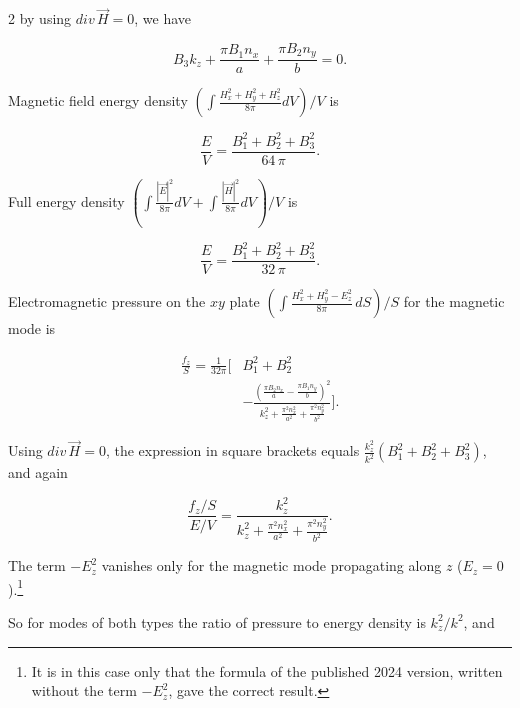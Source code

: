\documentclass[twoside, 10pt]{article}
\begin{document}
\begin{multicols}{2}
    by using \(div\,\vec{H} = 0\), we have

\begin{equation}B_{3} k_{z} + \frac{\pi B_{1} n_{x}}{a} + \frac{\pi B_{2} n_{y}}{b} = 0.\end{equation}

    Magnetic field energy density
\(\left(\int \frac{H_x^2+H_y^2+H_z^2}{8 \pi}dV\right)\big/{V}\) is

\begin{equation}\frac{E}{V} = \frac{{B_{1}^{2} + B_{2}^{2} + B_{3}^{2}}}{64 \, \pi}.\end{equation}

    Full energy density
\(\left(\int \frac{|\vec{E}|^2}{8 \pi}dV + \int \frac{|\vec{H}|^2}{8 \pi}dV\right)\big/{V}\)
is

\begin{equation}\frac{E}{V} = \frac{{B_{1}^{2} + B_{2}^{2} + B_{3}^{2}}}{32 \, \pi}.\end{equation}

    Electromagnetic pressure on the \(xy\) plate
\(\left(\int \frac{H_x^2+H_y^2-E_z^2}{8\pi}\,dS\right)\big/S\) for the magnetic mode is

\begin{equation}\begin{aligned}\frac{f_z}{S}=\frac{1}{32\pi}\Bigg[&B_{1}^{2} + B_{2}^{2}\\
&- \frac{\left(\frac{\pi B_{2} n_{x}}{a} - \frac{\pi B_{1} n_{y}}{b}\right)^{2}}{k_{z}^{2} + \frac{\pi^{2} n_{x}^{2}}{a^{2}} + \frac{\pi^{2} n_{y}^{2}}{b^{2}}}\Bigg].\end{aligned}\end{equation}

Using \(div\,\vec{H}=0\), the expression in square brackets equals
\(\frac{k_z^2}{k^2}\left(B_1^2+B_2^2+B_3^2\right)\), and again

\begin{equation}\frac{f_z/S}{E/V} = \frac{k_{z}^{2}}{k_{z}^{2} + \frac{\pi^{2} n_{x}^{2}}{a^{2}} + \frac{\pi^{2} n_{y}^{2}}{b^{2}}}.\end{equation}

The term \(-E_z^2\) vanishes only for the magnetic mode propagating along \(z\) (\(E_z=0\)).\footnote{It is in this case only that the formula of the published 2024 version, written without the term \(-E_z^2\), gave the correct result.}

So for modes of both types the ratio of pressure to energy density is \(k_z^2/k^2\), and


\end{multicols}
\end{document}

